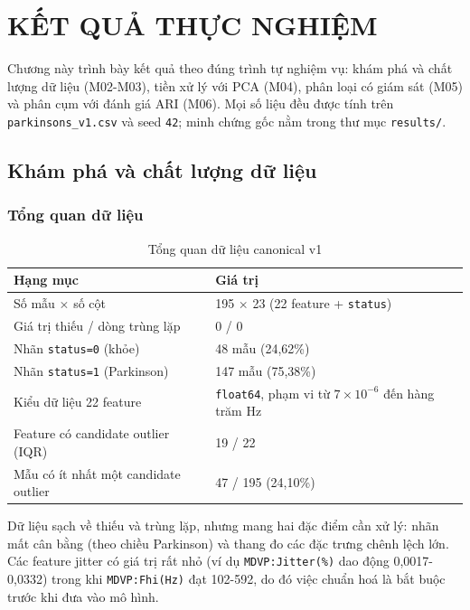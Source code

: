 \chapter{KẾT QUẢ THỰC NGHIỆM}
\label{chap:results}

Chương này trình bày kết quả theo đúng trình tự nghiệm vụ: khám phá và chất lượng dữ
liệu (M02-M03), tiền xử lý với PCA (M04), phân loại có giám sát (M05) và phân cụm với
đánh giá ARI (M06). Mọi số liệu đều được tính trên \texttt{parkinsons\_v1.csv} và seed
\texttt{42}; minh chứng gốc nằm trong thư mục \texttt{results/}.

\section{Khám phá và chất lượng dữ liệu}

\subsection{Tổng quan dữ liệu}

\begin{table}[H]
\centering
\caption{Tổng quan dữ liệu canonical v1}
\begin{tabular}{|l|l|}
\hline
\textbf{Hạng mục} & \textbf{Giá trị} \\
\hline
Số mẫu $\times$ số cột & 195 $\times$ 23 (22 feature + \texttt{status}) \\
\hline
Giá trị thiếu / dòng trùng lặp & 0 / 0 \\
\hline
Nhãn \texttt{status=0} (khỏe) & 48 mẫu (24,62\%) \\
\hline
Nhãn \texttt{status=1} (Parkinson) & 147 mẫu (75,38\%) \\
\hline
Kiểu dữ liệu 22 feature & \texttt{float64}, phạm vi từ $7\times10^{-6}$ đến hàng trăm Hz \\
\hline
Feature có candidate outlier (IQR) & 19 / 22 \\
\hline
Mẫu có ít nhất một candidate outlier & 47 / 195 (24,10\%) \\
\hline
\end{tabular}
\end{table}

Dữ liệu sạch về thiếu và trùng lặp, nhưng mang hai đặc điểm cần xử lý: nhãn mất cân bằng
(theo chiều Parkinson) và thang đo các đặc trưng chênh lệch lớn. Các feature jitter có giá
trị rất nhỏ (ví dụ \texttt{MDVP:Jitter(\%)} dao động 0,0017-0,0332) trong khi
\texttt{MDVP:Fhi(Hz)} đạt 102-592, do đó việc chuẩn hoá là bắt buộc trước khi đưa vào mô
hình.

